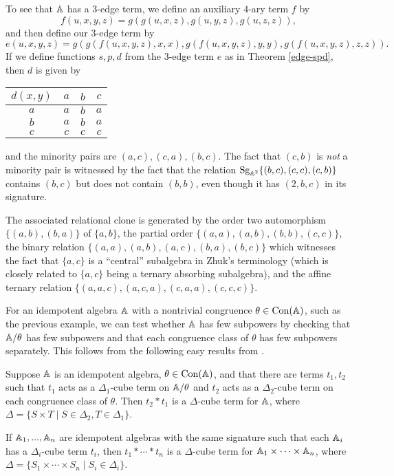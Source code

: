 \documentclass[letterpaper,11pt]{article}
\DeclareMathOperator{\Sg}{Sg}
\DeclareMathOperator{\Con}{Con}
\begin{document}
\begin{ex}
To see that $\mathbb{A}$ has a $3$-edge term, we define an auxiliary $4$-ary term $f$ by
\[
f(u,x,y,z) = g(g(u,x,z),g(u,y,z),g(u,z,z)),
\]
and then define our $3$-edge term by
\[
e(u,x,y,z) = g(g(f(u,x,y,z),x,x),g(f(u,x,y,z),y,y),g(f(u,x,y,z),z,z)).
\]
If we define functions $s,p,d$ from the $3$-edge term $e$ as in Theorem \ref{edge-spd}, then $d$ is given by
\begin{center}
\begin{tabular}{c|ccc}
$d(x,y)$ & $a$ & $b$ & $c$\\ \hline $a$ & $a$ & $b$ & $a$\\ $b$ & $a$ & $b$ & $a$\\ $c$ & $c$ & $c$ & $c$
\end{tabular}
\end{center}
and the minority pairs are $(a,c), (c,a), (b,c)$. The fact that $(c,b)$ is \emph{not} a minority pair is witnessed by the fact that the relation $\Sg_{\bA^2}\{(b,c),(c,c),(c,b)\}$ contains $(b,c)$ but does not contain $(b,b)$, even though it has $(2,b,c)$ in its signature.

The associated relational clone is generated by the order two automorphism $\{(a,b),(b,a)\}$ of $\{a,b\}$, the partial order $\{(a,a),(a,b),(b,b),(c,c)\}$, the binary relation $\{(a,a),(a,b),(a,c),(b,a),(b,c)\}$ which witnesses the fact that $\{a,c\}$ is a ``central'' subalgebra in Zhuk's terminology \cite{zhuk-dichotomy} (which is closely related to $\{a,c\}$ being a ternary absorbing subalgebra), and the affine ternary relation $\{(a,a,c),(a,c,a),(c,a,a),(c,c,c)\}$.
\end{ex}

For an idempotent algebra $\mathbb{A}$ with a nontrivial congruence $\theta \in \Con(\bA)$, such as the previous example, we can test whether $\mathbb{A}$ has few subpowers by checking that $\mathbb{A}/\theta$ has few subpowers and that each congruence class of $\theta$ has few subpowers separately. This follows from the following easy results from \cite{cube-term-blockers}.

\begin{prop} Suppose $\mathbb{A}$ is an idempotent algebra, $\theta \in \Con(\bA)$, and that there are terms $t_1,t_2$ such that $t_1$ acts as a $\Delta_1$-cube term on $\mathbb{A}/\theta$ and $t_2$ acts as a $\Delta_2$-cube term on each congruence class of $\theta$. Then $t_2*t_1$ is a $\Delta$-cube term for $\mathbb{A}$, where $\Delta = \{S\times T \mid S \in \Delta_2, T \in \Delta_1\}$.
\end{prop}

\begin{cor} If $\mathbb{A}_1, ..., \mathbb{A}_n$ are idempotent algebras with the same signature such that each $\mathbb{A}_i$ has a $\Delta_i$-cube term $t_i$, then $t_1*\cdots*t_n$ is a $\Delta$-cube term for $\mathbb{A}_1 \times \cdots \times \mathbb{A}_n$, where $\Delta = \{S_1\times \cdots \times S_n \mid S_i \in \Delta_i\}$.
\end{cor}
\end{document}
